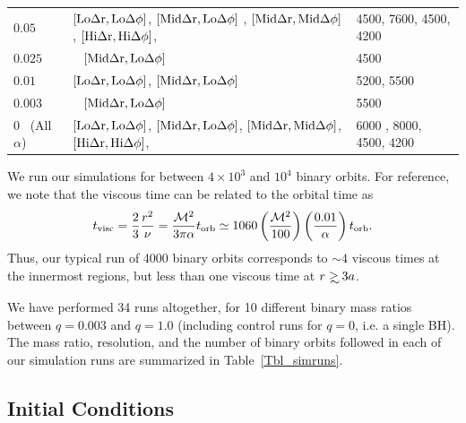 \begin{table}
\begin{center}
\begin{tabular}{   l   |    l   |   l    }
   $0.05$  &   $\left[\rm{Lo}\Delta r, \rm{Lo}\Delta \phi \right]$,  $\left[\rm{Mid}\Delta r, \rm{Lo}\Delta \phi \right]$     ,  $\left[\rm{\rm{Mid}\Delta r}, \rm{Mid}\Delta \phi \right]$,    $\left[\rm{\rm{Hi}\Delta r}, \rm{Hi}\Delta \phi \right]$,  &  4500, 7600, 4500, 4200     \\ 
   $0.025$   &  \hbox{  } \qquad  \qquad \qquad $\left[\rm{Mid}\Delta r, \rm{Lo}\Delta \phi \right]$     &  4500       \\ 
   $0.01$  &   $\left[\rm{Lo}\Delta r, \rm{Lo}\Delta \phi \right]$,  $\left[\rm{Mid}\Delta r, \rm{Lo}\Delta \phi \right]$      &  5200, 5500     \\
   $0.003$  &     \hbox{  } \qquad  \qquad \qquad   $\left[\rm{Mid}\Delta r, \rm{Lo}\Delta \phi \right]$      &  5500     \\
     $0$ \  (All $\alpha$)  &   $\left[\rm{Lo}\Delta r, \rm{Lo}\Delta \phi \right]$,  $\left[\rm{Mid}\Delta r, \rm{Lo}\Delta \phi \right]$,  $\left[\rm{\rm{Mid}\Delta r}, \rm{Mid}\Delta \phi \right]$,    $\left[\rm{\rm{Hi}\Delta r}, \rm{Hi}\Delta \phi \right]$,  & 6000 , 8000, 4500, 4200
   \label{runs}
  \end{tabular}
 \end{center}
\end{table}

We run our simulations for between $4\times 10^3$ and $10^4$ binary
orbits. For reference, we note that the viscous time can be related
to the orbital time as
%
\begin{equation}
t_{\rm visc} = \frac{2}{3}\frac{r^2}{\nu} =\frac{\mathcal{M}^2}{3 \pi \alpha} t_{\rm orb} \simeq 1060 \left( \frac{\mathcal{M}^2}{100} \right) \left(\frac{0.01}{\alpha} \right) t_{\rm orb}.
\label{tv_torb}
\end{equation}
%
Thus, our typical run of 4000 binary orbits corresponds to $\sim4$ viscous
times at the innermost regions, but less than one viscous time at
$r\gsim3a$.

We have performed 34 runs altogether, for 10 different binary mass
ratios between $q=0.003$ and $q=1.0$ (including control runs for
$q=0$, i.e. a single BH). The mass ratio, resolution, and the number
of binary orbits followed in each of our simulation runs are
summarized in Table~\ref{Tbl_simruns}.

\subsection{Initial Conditions}
\label{Initial Conditions}

